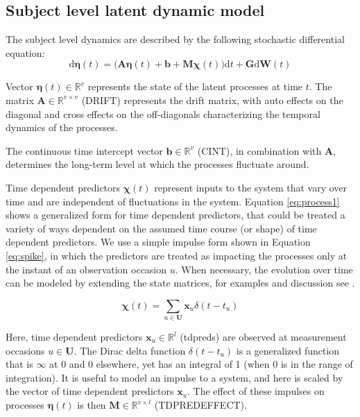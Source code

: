 \documentclass[11pt]{article}\usepackage[]{graphicx}\usepackage[]{color}
\newcommand{\vect}[1]{\boldsymbol{\mathbf{#1}}}
\begin{document}
\subsection{Subject level latent dynamic model}
The subject level dynamics are described by the following stochastic differential equation:
\begin{equation}
\label{eq:process1}
\mathrm{d} \vect{\eta} (t) =
\bigg( 
\vect{A \eta} (t) +
\vect{b} +
\vect{M \chi} (t)  
\bigg) \mathrm{d} t +
\vect{G} \mathrm{d} \vect{W}(t)  
\end{equation}

Vector $ \vect{\eta} (t)\in\mathbb{R}^{v}$ represents the state of the latent processes at time $t$. The matrix $ \vect{A} \in \mathbb{R}^{v \times v}$ (DRIFT) represents the drift matrix, with auto effects on the diagonal and cross effects on the off-diagonals characterizing the temporal dynamics of the processes. 

The continuous time intercept vector $ \vect{b} \in\mathbb{R}^{v}$ (CINT), in combination with $\vect{A}$, determines the long-term level at which the processes fluctuate around.

Time dependent predictors $\vect{\chi}(t)$ represent inputs to the system that vary over time and are independent of fluctuations in the system. Equation \ref{eq:process1} shows a generalized form for time dependent predictors, that could be treated a variety of ways dependent on the assumed time course (or shape) of time dependent predictors. We use a simple impulse form shown in Equation \ref{eq:spike}, in which the predictors are treated as impacting the processes only at the instant of an observation occasion $u$. When necessary, the evolution over time can be modeled by extending the state matrices, for examples and discussion see \citet{driver2017understanding}.

\begin{equation}
\label{eq:spike}
\vect{\chi} (t) = \sum_{ u \in \vect{U}}  \vect{x}_{u} \delta (t-t_u)     
\end{equation}

Here, time dependent predictors $\vect{x}_u \in \mathbb{R}^{l}$ (tdpreds) are observed at measurement occasions $ u \in \vect{U}$. The Dirac delta function $\delta(t-t_u)$ is a generalized function that is $\infty$ at 0 and 0 elsewhere, yet has an integral of 1 (when 0 is in the range of integration). It is useful to model an impulse to a system, and here is scaled by the vector of time dependent predictors $\vect{x}_u$.  The effect of these impulses on processes $\vect{\eta}(t)$ is then $\vect{M}\in \mathbb{R}^{v \times l}$ (TDPREDEFFECT). 
\end{document}
